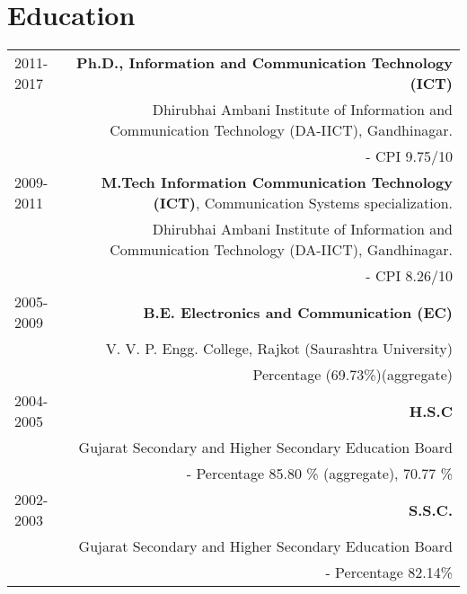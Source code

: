 \documentclass[10pt]{article}
\begin{document}
%


\section*{Education}
\begin{tabular}{L!{\VRule}R}
2011-2017& \textbf{Ph.D., Information and Communication Technology (ICT)}\\& Dhirubhai Ambani Institute of Information and Communication Technology (DA-IICT), Gandhinagar.\\&- CPI 9.75/10 \vspace{0.4cm}\\
2009-2011&\textbf{M.Tech Information Communication Technology (ICT)}, Communication Systems specialization. \\&Dhirubhai Ambani Institute of Information and Communication Technology (DA-IICT), Gandhinagar.\\&- CPI 8.26/10\vspace{0.4cm}\\
2005-2009&\textbf{B.E. Electronics and Communication (EC)}\\&V. V. P. Engg. College, Rajkot (Saurashtra University)\\& Percentage (69.73\%)(aggregate)\vspace{0.3cm}\\
2004-2005&\textbf{H.S.C}\\&Gujarat Secondary and Higher Secondary Education Board\\&- Percentage 85.80 \% (aggregate), 70.77 \%\vspace{0.4cm}\\
2002-2003&\textbf{S.S.C.}\\&Gujarat Secondary and Higher Secondary Education Board\\&- Percentage 82.14\% 
\end{tabular}
\vspace{0.25cm}
\end{document}
